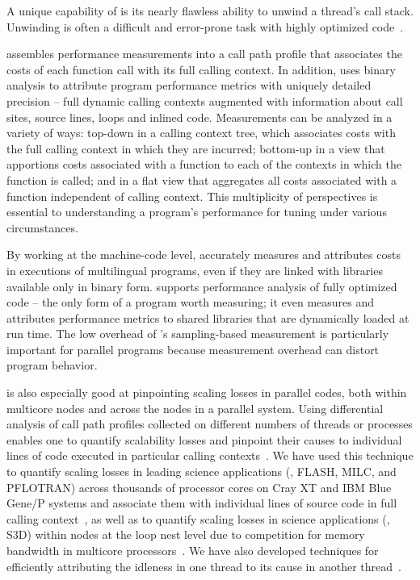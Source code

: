 \documentclass[11pt,letterpaper]{report}
\begin{document}
A unique capability of \HPCToolkit{} is its nearly flawless ability to unwind a thread's call stack.
Unwinding is often a difficult and error-prone task with highly optimized code~\cite{Tallent-MC-Fagan:2009:PLDI-hpctoolkit-binary-analysis}.

\HPCToolkit{} assembles performance measurements into a call path profile that associates the costs of each function call with its full calling context.
In addition, \HPCToolkit{} uses binary analysis to attribute program performance metrics with uniquely detailed precision -- full dynamic calling contexts augmented with information about call sites, source lines, loops and inlined code.
Measurements can be analyzed in a variety of ways: top-down in a calling context tree, which associates costs with the full calling context in which they are incurred; bottom-up in a view that apportions costs associated with a function to each of the contexts in which the function is called; and in a flat view that aggregates all costs associated with a function independent of calling context.
This multiplicity of perspectives is essential to understanding a program's performance for tuning under various circumstances.

By working at the machine-code level, \HPCToolkit{} accurately measures and attributes costs in executions of multilingual programs, even if they are linked with libraries available only in binary form.
\HPCToolkit{} supports performance analysis of fully optimized code -- the only form of a program worth measuring; it even measures and attributes performance metrics to shared libraries that are dynamically loaded at run time.
The low overhead of \HPCToolkit{}'s sampling-based measurement is particularly important for parallel programs because measurement overhead can distort program behavior.

\HPCToolkit{} is also especially good at pinpointing scaling losses in parallel codes, both within multicore nodes and across the nodes in a parallel system.
Using differential analysis of call path profiles collected on different numbers of threads or processes enables one to quantify scalability losses and pinpoint their causes to individual lines of code executed in particular calling contexts~\cite{Coarfa-MC:2007:ICS-scalability}.
We have used this technique to quantify scaling losses in leading science applications (\eg{}, FLASH, MILC, and PFLOTRAN) across thousands of processor cores on Cray XT and IBM Blue Gene/P systems and associate them with individual lines of source code in full calling context~\cite{Tallent-MC-etal:2009:SC-hpctoolkit-petascale,Tallent-MC-etal:2010:SC-hpctoolkit-load-imbalance}, as well as to quantify scaling losses in science applications (\eg{}, S3D) within nodes at the loop nest level due to competition for memory bandwidth in multicore processors~\cite{Tallent-etal:2008:SciDAC-hpctoolkit}.
We have also developed techniques for efficiently attributing the idleness in one thread to its cause in another thread~\cite{Tallent-MC:2009:PPoPP-hpctoolkit-work-stealing,Tallent-MC-Porterfield:2010:PPoPP-hpctoolkit-lock-contention}.
\end{document}
